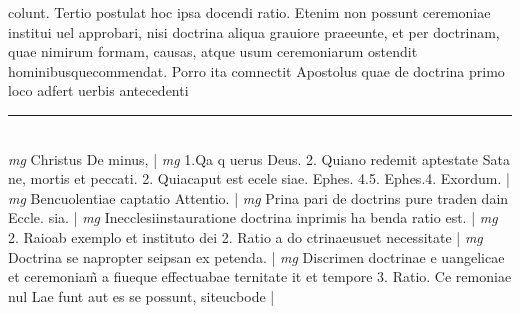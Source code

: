 \documentclass{article}
\begin{document}
\begin{pages}
colunt. Tertio postulat hoc ipsa docendi ratio. Etenim non possunt ceremoniae institui uel approbari, nisi doctrina aliqua grauiore praeeunte, et per doctrinam, quae nimirum formam, causas, atque  usum ceremoniarum ostendit hominibusquecommendat. Porro ita comnectit Apostolus quae de doctrina primo loco adfert uerbis antecedenti  \pend
\vspace{0.5cm}\noindent
\vspace{0.2cm}\rule{1cm}{0.2pt}\\ 
\hspace{0.2cm}\textit{mg}
\footnotesize Christus De minus, 
\normalsize| 
\hspace{0.2cm}\textit{mg}
\footnotesize 1.Qa q uerus Deus. 2. Quiano redemit aptestate Sata ne, mortis et peccati. 2. Quiacaput est ecele siae. Ephes. 4.5. Ephes.4. Exordum. 
\normalsize| 
\hspace{0.2cm}\textit{mg}
\footnotesize Bencuolentiae captatio Attentio. 
\normalsize| 
\hspace{0.2cm}\textit{mg}
\footnotesize Prina pari de doctrins pure traden dain Eccle. sia. 
\normalsize| 
\hspace{0.2cm}\textit{mg}
\footnotesize Inecclesiinstauratione doctrina inprimis ha benda ratio est. 
\normalsize| 
\hspace{0.2cm}\textit{mg}
\footnotesize 2. Raioab exemplo et instituto dei 2. Ratio a do ctrinaeusuet necessitate 
\normalsize| 
\hspace{0.2cm}\textit{mg}
\footnotesize Doctrina se napropter seipsan ex petenda. 
\normalsize| 
\hspace{0.2cm}\textit{mg}
\footnotesize Discrimen doctrinae e uangelicae et ceremoniam̃ a fiueque  effectuabae ternitate it et tempore 3. Ratio. Ce remoniae nul Lae funt aut es se possunt, siteucbode 
\normalsize| 

\end{pages}
\end{document}
